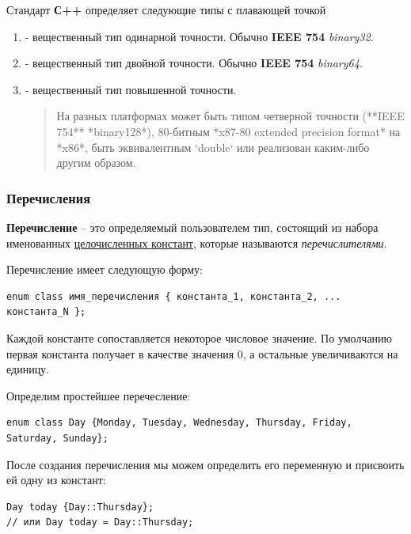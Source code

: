 Стандарт \textbf{С++} определяет следующие типы с плавающей точкой
\begin{enumerate}
    \item {} - вещественный тип одинарной точности. Обычно
          \textbf{IEEE 754} \emph{binary32}.
    \item {} - вещественный тип
          двойной точности. Обычно \textbf{IEEE 754} \emph{binary64}.
    \item {} - вещественный тип повышенной точности.
          \begin{quote}
              На разных платформах может быть типом четверной точности (**IEEE 754** *binary128*), 80-битным *x87-80 extended precision format* на *x86*, быть эквивалентным `double` или реализован каким-либо другим образом.
          \end{quote}
\end{enumerate}

\subsubsection{Перечисления}

\textbf{Перечисление} -- это определяемый пользователем тип, состоящий из набора именованных \underline{целочисленных констант}, которые называются \textit{перечислителями}.

\vspace{\baselineskip}

Перечисление имеет следующую форму:
\begin{verbatim}
enum class имя_перечисления { константа_1, константа_2, ... константа_N };
\end{verbatim}

Каждой константе сопоставляется некоторое числовое значение. По умолчанию первая константа получает в качестве значения 0, а остальные увеличиваются на единицу.

\vspace{\baselineskip}

Определим простейшее перечесление:
\begin{verbatim}
enum class Day {Monday, Tuesday, Wednesday, Thursday, Friday, Saturday, Sunday};
\end{verbatim}

После создания перечисления мы можем определить его переменную и присвоить ей одну из констант:

\begin{verbatim}
Day today {Day::Thursday};
// или Day today = Day::Thursday;
\end{verbatim}

